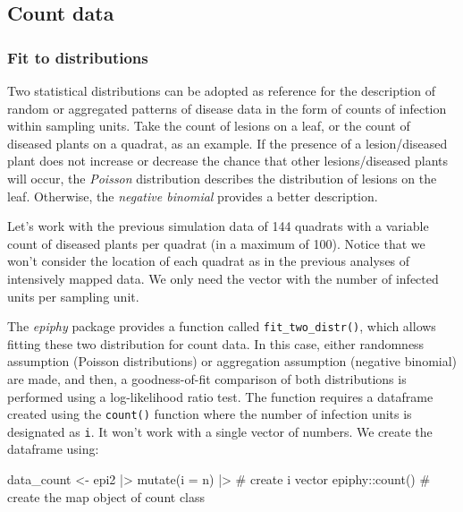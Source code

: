 \documentclass[
  letterpaper,
  DIV=11,
  numbers=noendperiod]{scrreprt}
\newenvironment{Shaded}{\begin{snugshade}}{\end{snugshade}}
\newcommand{\AttributeTok}[1]{\textcolor[rgb]{0.40,0.45,0.13}{#1}}
\newcommand{\CommentTok}[1]{\textcolor[rgb]{0.37,0.37,0.37}{#1}}
\newcommand{\FunctionTok}[1]{\textcolor[rgb]{0.28,0.35,0.67}{#1}}
\newcommand{\NormalTok}[1]{\textcolor[rgb]{0.00,0.23,0.31}{#1}}
\newcommand{\OtherTok}[1]{\textcolor[rgb]{0.00,0.23,0.31}{#1}}
\newcommand{\SpecialCharTok}[1]{\textcolor[rgb]{0.37,0.37,0.37}{#1}}
\begin{document}
\hypertarget{count-data}{%
\subsection{Count data}\label{count-data}}

\hypertarget{fit-to-distributions}{%
\subsubsection{Fit to distributions}\label{fit-to-distributions}}

Two statistical distributions can be adopted as reference for the
description of random or aggregated patterns of disease data in the form
of counts of infection within sampling units. Take the count of lesions
on a leaf, or the count of diseased plants on a quadrat, as an example.
If the presence of a lesion/diseased plant does not increase or decrease
the chance that other lesions/diseased plants will occur, the
\emph{Poisson} distribution describes the distribution of lesions on the
leaf. Otherwise, the \emph{negative binomial} provides a better
description.

Let's work with the previous simulation data of 144 quadrats with a
variable count of diseased plants per quadrat (in a maximum of 100).
Notice that we won't consider the location of each quadrat as in the
previous analyses of intensively mapped data. We only need the vector
with the number of infected units per sampling unit.

The \emph{epiphy} package provides a function called
\texttt{fit\_two\_distr()}, which allows fitting these two distribution
for count data. In this case, either randomness assumption (Poisson
distributions) or aggregation assumption (negative binomial) are made,
and then, a goodness-of-fit comparison of both distributions is
performed using a log-likelihood ratio test. The function requires a
dataframe created using the \texttt{count()} function where the number
of infection units is designated as \texttt{i}. It won't work with a
single vector of numbers. We create the dataframe using:

\begin{Shaded}
\begin{Highlighting}[]
\NormalTok{data\_count }\OtherTok{\textless{}{-}}\NormalTok{ epi2 }\SpecialCharTok{|\textgreater{}} 
  \FunctionTok{mutate}\NormalTok{(}\AttributeTok{i =}\NormalTok{ n) }\SpecialCharTok{|\textgreater{}}  \CommentTok{\# create i vector}
\NormalTok{  epiphy}\SpecialCharTok{::}\FunctionTok{count}\NormalTok{()   }\CommentTok{\# create the map object of count class}
\end{Highlighting}
\end{Shaded}
\end{document}
